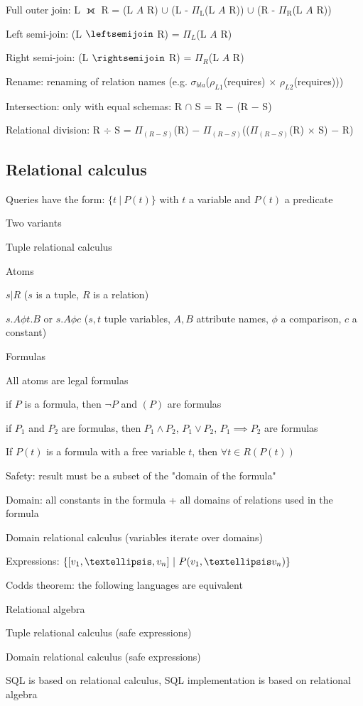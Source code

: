 		\item Full outer join:  L $\fullouterjoin$ R = (L $A$ R) $\cup$ (L - $\Pi_{\text{L}}$(L $A$ R)) $\cup$ (R - $\Pi_{\text{R}}$(L $A$ R))
		\item Left semi-join: (L $\leftsemijoin$ R) = $\Pi_{L}$(L $A$ R)
		\item Right semi-join: (L $\rightsemijoin$ R) = $\Pi_{R}$(L $A$ R)
		\item Rename: renaming of relation names (e.g. $\sigma_{bla}$($\rho_{L1}$(requires) $\times$ $\rho_{L2}$(requires)))
		\item Intersection: only with equal schemas: R $\cap$ S = R $-$ (R $-$ S)
		\item Relational division: R $\div$ S = $\Pi_{(R-S)}$(R) $-$ $\Pi_{(R-S)}$(($\Pi_{(R-S)}$(R) $\times$ S) $-$ R) 
	\enumend
\enumend

\subsection{Relational calculus}
\enumstart
	\item Queries have the form: $\{t \ | \ P(t)\}$ with $t$ a variable and $P(t)$ a predicate
	\item Two variants
	\enumstart
		\item Tuple relational calculus
		 \enumstart
		 	\item Atoms
		 	\enumstart
		 		\item $s | R$ ($s$ is a tuple, $R$ is a relation)
		 		\item $s.A \phi t.B$ or $s.A \phi c$ ($s,t$ tuple variables, $A,B$ attribute names, $\phi$ a comparison, $c$ a constant)
		 	\enumend
		 	\item Formulas
		 	\enumstart
		 		\item All atoms are legal formulas
		 		\item if $P$ is a formula, then $\lnot P$ and $(P)$ are formulas
		 		\item if $P_1$ and $P_2$ are formulas, then $P_1 \land P_2$, $P_1 \lor P_2$, $P_1 \implies P_2$ are formulas
		 		\item If $P(t)$ is a formula with a free variable $t$, then $\forall t \in R(P(t))$
		 	\enumend
		 	\item Safety: result must be a subset of the "domain of the formula"
		 	\item Domain: all constants in the formula + all domains of relations used in the formula
		 \enumend
		\item Domain relational calculus (variables iterate over domains)
		\enumstart
			\item Expressions: $\{[v_1, \ddd, v_n] \ | \ P(v_1, \ddd v_n)\}$
		\enumend
		\item Codds theorem: the following languages are equivalent
		\enumstart
			\item Relational algebra
			\item Tuple relational calculus (safe expressions)
			\item Domain relational calculus (safe expressions)
		\enumend
		\item \arrow SQL is based on relational calculus, SQL implementation is based on relational algebra
	\enumend
\enumend
